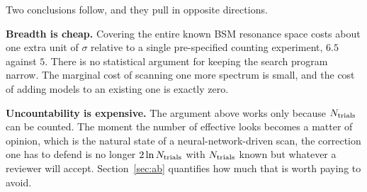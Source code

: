 Two conclusions follow, and they pull in opposite directions.

\textbf{Breadth is cheap.} Covering the entire known BSM resonance space costs about one extra
unit of $\sigma$ relative to a single pre-specified counting experiment, $6.5$ against $5$. There
is no statistical argument for keeping the search program narrow. The marginal cost of scanning
one more spectrum is small, and the cost of adding models to an existing one is exactly zero.

\textbf{Uncountability is expensive.} The argument above works only because $N_{\mathrm{trials}}$ can be
counted. The moment the number of effective looks becomes a matter of opinion, which is the
natural state of a neural-network-driven scan, the correction one has to defend is no longer $2\ln
N_{\mathrm{trials}}$ with $N_{\mathrm{trials}}$ known but whatever a reviewer will accept. Section~\ref{sec:ab} quantifies how
much that is worth paying to avoid.
